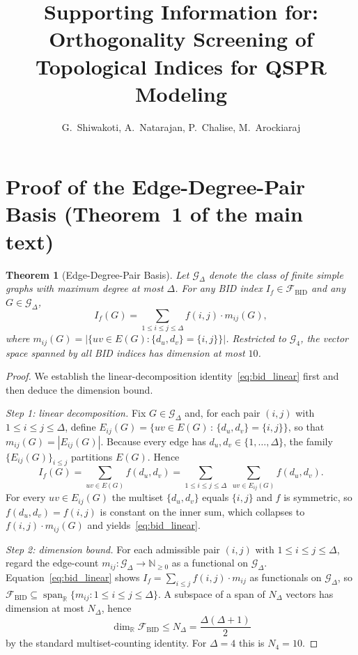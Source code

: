 \documentclass[11pt,a4paper]{article}
\title{\bfseries Supporting Information for:\\ Orthogonality Screening of Topological Indices for QSPR Modeling}
\author{G.~Shiwakoti, A.~Natarajan, P.~Chalise, M.~Arockiaraj}
\date{}
\newtheorem{theorem}{Theorem}\theoremstyle{definition}\newtheorem{remark}[theorem]{Remark}
\newcommand{\bid}{\mathcal{F}_{\mathrm{BID}}}
\begin{document}
\maketitle

\section{Proof of the Edge-Degree-Pair Basis (Theorem~1 of the main text)}

\begin{theorem}[Edge-Degree-Pair Basis]\label{thm:bid}
Let $\mathcal{G}_\Delta$ denote the class of finite simple graphs
with maximum degree at most $\Delta$. For any BID index
$I_f\in\bid$ and any $G\in\mathcal{G}_\Delta$,
\begin{equation}\label{eq:bid_linear}
I_f(G)=\sum_{1\le i\le j\le\Delta} f(i,j)\cdot m_{ij}(G),
\end{equation}
where $m_{ij}(G)=\bigl|\{uv\in E(G):\{d_u,d_v\}=\{i,j\}\}\bigr|$.
Restricted to $\mathcal{G}_4$, the vector space spanned by all BID
indices has dimension at most $10$.
\end{theorem}

\begin{proof}
We establish the linear-decomposition identity~\eqref{eq:bid_linear}
first and then deduce the dimension bound.

\emph{Step 1: linear decomposition.} Fix $G\in\mathcal{G}_\Delta$ and,
for each pair $(i,j)$ with $1\le i\le j\le\Delta$, define
$E_{ij}(G) = \{ uv\in E(G) \,:\, \{d_u,d_v\}=\{i,j\}\}$,
so that $m_{ij}(G)=|E_{ij}(G)|$. Because every edge has
$d_u,d_v\in\{1,\ldots,\Delta\}$, the family $\{E_{ij}(G)\}_{i\le j}$
partitions $E(G)$. Hence
\[
I_f(G) = \sum_{uv\in E(G)} f(d_u,d_v)
= \sum_{1\le i\le j\le\Delta}\;\sum_{uv\in E_{ij}(G)} f(d_u,d_v).
\]
For every $uv\in E_{ij}(G)$ the multiset $\{d_u,d_v\}$ equals
$\{i,j\}$ and $f$ is symmetric, so $f(d_u,d_v)=f(i,j)$ is constant
on the inner sum, which collapses to $f(i,j)\cdot m_{ij}(G)$ and
yields~\eqref{eq:bid_linear}.

\emph{Step 2: dimension bound.} For each admissible pair $(i,j)$
with $1\le i\le j\le\Delta$, regard the edge-count
$m_{ij}:\mathcal{G}_\Delta\to\mathbb{N}_{\ge 0}$ as a functional on
$\mathcal{G}_\Delta$. Equation~\eqref{eq:bid_linear} shows
$I_f = \sum_{i\le j} f(i,j)\cdot m_{ij}$ as functionals on
$\mathcal{G}_\Delta$, so
$\bid \subseteq \operatorname{span}_{\mathbb{R}}\{m_{ij}:1\le i\le j\le\Delta\}$.
A subspace of a span of $N_\Delta$ vectors has dimension at most
$N_\Delta$, hence
\[
\dim_{\mathbb{R}}\bid \le N_\Delta = \frac{\Delta(\Delta+1)}{2}
\]
by the standard multiset-counting identity. For $\Delta=4$ this is
$N_4=10$.
\end{proof}
\end{document}
